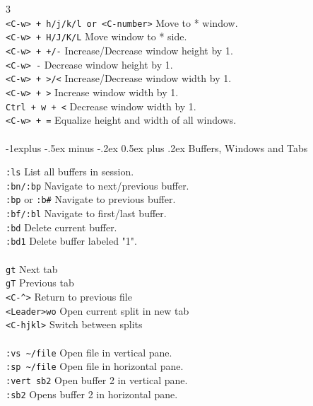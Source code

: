 \documentclass[10pt,landscape]{article}
\makeatletter
\renewcommand{\subsection}{\@startsection{subsection}{2}{0mm}%
                                {-1explus -.5ex minus -.2ex}%
                                {0.5ex plus .2ex}%
                                {\normalfont\normalsize\bfseries}}
\makeatother
\begin{document}
\begin{multicols}{3}
\verb! !\\
\verb!<C-w> + h/j/k/l or <C-number>! \hfill Move to * window.\\
\verb!<C-w> + H/J/K/L! \hfill Move window to * side.\\                                   
\verb!<C-w> + +/-! \hfill Increase/Decrease window height by 1.\\      
\verb!<C-w> -! \hfill Decrease window height by 1.\\                        
\verb!<C-w> + >/<!  \hfill Increase/Decrease window width by 1.\\                      
\verb!<C-w> + >!  \hfill Increase window width by 1.\\     
\verb!Ctrl + w + <!  \hfill Decrease window width by 1.\\           
\verb!<C-w> + =!  \hfill Equalize height and width of all windows.\\

\verb! !\\
\subsection{Buffers, Windows and Tabs}

\verb!:ls! \hfill List all buffers in session.\\
\verb!:bn/:bp! \hfill Navigate to next/previous buffer.\\
\verb!:bp! or \verb!:b#! \hfill Navigate to previous buffer.\\
\verb!:bf/:bl! \hfill Navigate to first/last buffer.\\
\verb!:bd! \hfill Delete current buffer.\\
\verb!:bd1! \hfill Delete buffer labeled "1".\\ 
\verb! !\\

\verb!gt! \hfill Next tab\\
\verb!gT! \hfill Previous tab\\
\verb!<C-^>! \hfill Return to previous file\\
\verb!<Leader>wo! \hfill Open current split in new tab\\
\verb!<C-hjkl>! \hfill Switch between splits\\


\verb! !\\


\verb!:vs ~/file! \hfill Open file in vertical pane.\\
\verb!:sp ~/file! \hfill Open file in horizontal pane.\\   
\verb!:vert sb2! \hfill Open buffer 2 in vertical pane.\\
\verb!:sb2! \hfill Opens buffer 2 in horizontal pane.\\
\verb! !\\


\end{multicols}
\end{document}
